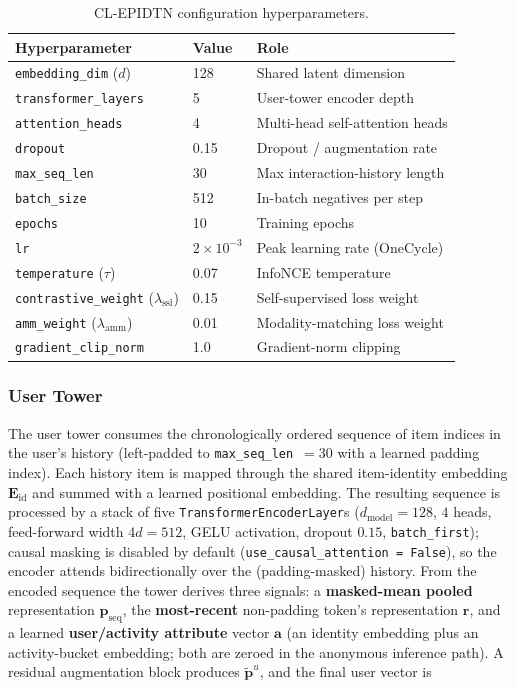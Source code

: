 \begin{table}[H]
    \centering
    \caption{CL-EPIDTN configuration hyperparameters.}
    \label{tab:recconfig}
    \begin{tabular}{|l|l|p{6.5cm}|}
        \hline
        \textbf{Hyperparameter} & \textbf{Value} & \textbf{Role} \\ \hline
        \texttt{embedding\_dim} ($d$) & 128 & Shared latent dimension \\ \hline
        \texttt{transformer\_layers} & 5 & User-tower encoder depth \\ \hline
        \texttt{attention\_heads} & 4 & Multi-head self-attention heads \\ \hline
        \texttt{dropout} & 0.15 & Dropout / augmentation rate \\ \hline
        \texttt{max\_seq\_len} & 30 & Max interaction-history length \\ \hline
        \texttt{batch\_size} & 512 & In-batch negatives per step \\ \hline
        \texttt{epochs} & 10 & Training epochs \\ \hline
        \texttt{lr} & $2\times10^{-3}$ & Peak learning rate (OneCycle) \\ \hline
        \texttt{temperature} ($\tau$) & 0.07 & InfoNCE temperature \\ \hline
        \texttt{contrastive\_weight} ($\lambda_{\text{ssl}}$) & 0.15 & Self-supervised loss weight \\ \hline
        \texttt{amm\_weight} ($\lambda_{\text{amm}}$) & 0.01 & Modality-matching loss weight \\ \hline
        \texttt{gradient\_clip\_norm} & 1.0 & Gradient-norm clipping \\ \hline
    \end{tabular}
\end{table}

\subsubsection{User Tower}
The user tower consumes the chronologically ordered sequence of item indices in the user's history (left-padded to \texttt{max\_seq\_len}~$=30$ with a learned padding index). Each history item is mapped through the shared item-identity embedding $\mathbf{E}_{\text{id}}$ and summed with a learned positional embedding. The resulting sequence is processed by a stack of five \texttt{TransformerEncoderLayer}s ($d_{\text{model}}=128$, $4$ heads, feed-forward width $4d=512$, GELU activation, dropout $0.15$, \texttt{batch\_first}); causal masking is disabled by default (\texttt{use\_causal\_attention = False}), so the encoder attends bidirectionally over the (padding-masked) history. From the encoded sequence the tower derives three signals: a \textbf{masked-mean pooled} representation $\mathbf{p}_{\text{seq}}$, the \textbf{most-recent} non-padding token's representation $\mathbf{r}$, and a learned \textbf{user/activity attribute} vector $\mathbf{a}$ (an identity embedding plus an activity-bucket embedding; both are zeroed in the anonymous inference path). A residual augmentation block produces $\tilde{\mathbf{p}}^{u}$, and the final user vector is

